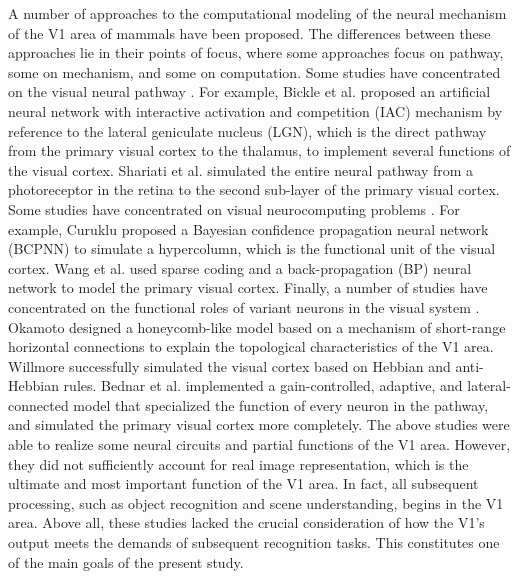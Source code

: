 \documentclass[journal]{IEEEtran}
\begin{document}
A number of approaches to the computational modeling of the neural mechanism of the V1 area of mammals have been proposed. 
The differences between these approaches lie in their points of focus, 
where some approaches focus on pathway, some on mechanism, and some on computation. 
Some studies have concentrated on the visual neural pathway 
\cite{bickle1999,shariati2012,nakagama2004,harvey2008}. 
For example, Bickle et al. \cite{bickle1999} proposed an artificial neural network with interactive activation and competition (IAC) mechanism by reference to the lateral geniculate nucleus (LGN), 
which is the direct pathway from the primary visual cortex to the thalamus, 
to implement several functions of the visual cortex. 
Shariati et al. \cite{shariati2012} simulated the entire neural pathway from a photoreceptor in the retina to the second sub-layer of the primary visual cortex. 
Some studies have concentrated on visual neurocomputing problems 
\cite{curuklu2002,wang2011,li2005,mihalas2011,ramirez2013}. 
For example, Curuklu \cite{curuklu2002} proposed a Bayesian confidence propagation neural network (BCPNN) to simulate a hypercolumn, which is the functional unit of the visual cortex. 
Wang et al. \cite{wang2011} used sparse coding and a back-propagation (BP) neural network to model the primary visual cortex. 
Finally, a number of studies have concentrated on the functional roles of variant neurons in the visual system \cite{okamoto2004,willmore2012,bednar2012,law2011,giacomantonio2010,zhao2010,yan2012,piech2013,song2013}. 
Okamoto \cite{okamoto2004} designed a honeycomb-like model based on a mechanism of short-range horizontal connections to explain the topological characteristics of the V1 area. 
Willmore \cite{willmore2012} successfully simulated the visual cortex based on Hebbian and anti-Hebbian rules. 
Bednar et al. \cite{bednar2012,law2011} implemented a gain-controlled, adaptive, 
and lateral-connected model that specialized the function of every neuron in the pathway, 
and simulated the primary visual cortex more completely. 
The above studies were able to realize some neural circuits and partial functions of the V1 area.
However, they did not sufficiently account for real image representation, 
which is the ultimate and most important function of the V1 area. 
In fact, all subsequent processing, such as object recognition and scene understanding, 
begins in the V1 area. 
Above all, these studies lacked the crucial consideration of how the V1's output meets the demands of subsequent recognition tasks. 
This constitutes one of the main goals of the present study.
\end{document}
